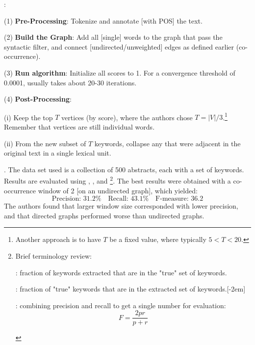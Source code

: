 \documentclass[11pt]{article}
\begin{document}
\myspace{}
\p {}:
\begin{compactitem}
	\item[(1)] \textbf{Pre-Processing}: Tokenize and annotate [with POS] the text.\vspace{0.3em}
	
	\item[(2)] \textbf{Build the Graph}: Add all [single] words to the graph that pass the syntactic filter, and connect [undirected/unweighted] edges as defined earlier (co-occurrence).
	
	\item[(3)] \textbf{Run algorithm}: Initialize all scores to 1. For a convergence threshold of 0.0001, usually takes about 20-30 iterations.
	
	\item[(4)] \textbf{Post-Processing}: 
	\begin{compactitem}
		\item[(i)] Keep the top $T$ vertices (by score), where the authors chose $T = |V|/3$.\footnote{Another approach is to have $T$ be a fixed value, where typically $5 < T < 20$.} Remember that vertices are still individual words.
		
		\item[(ii)] From the new subset of $T$ keywords, collapse any that were adjacent in the original text in a single lexical unit.
	\end{compactitem}
\end{compactitem}

\myspace
\p {}. The data set used is a collection of 500 abstracts, each with a set of keywords. Results are evaluated using , , and \footnote{
	Brief terminology review:
	\begin{compactitem}
		\item {}: fraction of keywords extracted that are in the "true" set of keywords.
		\item {}: fraction of "true" keywords that are in the extracted set of keywords.
		\item {}: combining precision and recall to get a single number for evaluation:
		$$
		F = \frac{2pr}{p + r}
		$$
	\end{compactitem}
	}. %
The best results were obtained with a co-occurrence window of 2 [on an undirected graph], which yielded:
$$
\text{Precision: } 31.2\% \quad \text{Recall: } 43.1\% \quad \text{F-measure: } 36.2
$$
The authors found that larger window size corresponded with lower precision, and that directed graphs performed worse than undirected graphs.
\end{document}
